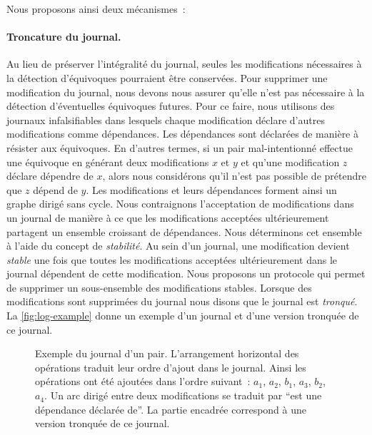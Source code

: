 Nous proposons ainsi deux mécanismes~:

\paragraph{Troncature du journal.} Au lieu de préserver l'intégralité du journal, seules les modifications nécessaires à la détection d'équivoques pourraient être conservées.
Pour supprimer une modification du journal, nous devons nous assurer qu'elle n'est pas nécessaire à la détection d'éventuelles équivoques futures.
Pour ce faire, nous utilisons des journaux infalsifiables dans lesquels chaque modification déclare d'autres modifications comme dépendances.
Les dépendances sont déclarées de manière à résister aux équivoques.
En d'autres termes, si un pair mal-intentionné effectue une équivoque en générant deux modifications $x$ et $y$ et qu'une modification $z$ déclare dépendre de $x$, alors nous considérons qu'il n'est pas possible de prétendre que $z$ dépend de $y$.
Les modifications et leurs dépendances forment ainsi un graphe dirigé sans cycle.
Nous contraignons l'acceptation de modifications dans un journal de manière à ce que les modifications acceptées ultérieurement partagent un ensemble croissant de dépendances.
Nous déterminons cet ensemble à l'aide du concept de \emph{stabilité}.
Au sein d'un journal, une modification devient \emph{stable} une fois que toutes les modifications acceptées ultérieurement dans le journal dépendent de cette modification.
Nous proposons un protocole qui permet de supprimer un sous-ensemble des modifications stables.
Lorsque des modifications sont supprimées du journal nous disons que le journal est \emph{tronqué}.
La \autoref{fig:log-example} donne un exemple d'un journal et d'une version tronquée de ce journal.

\begin{figure}[hbt]
\centering
{}
\caption[Exemple du journal d'un pair]{Exemple du journal d'un pair.
L'arrangement horizontal des opérations traduit leur ordre d'ajout dans le journal.
Ainsi les opérations ont été ajoutées dans l'ordre suivant~: $a_1$, $a_2$, $b_1$, $a_3$, $b_2$, $a_4$.
Un arc dirigé entre deux modifications se traduit par \enquote{est une dépendance déclarée de}.
La partie encadrée correspond à une version tronquée de ce journal.
}\label{fig:log-example}
\end{figure}

